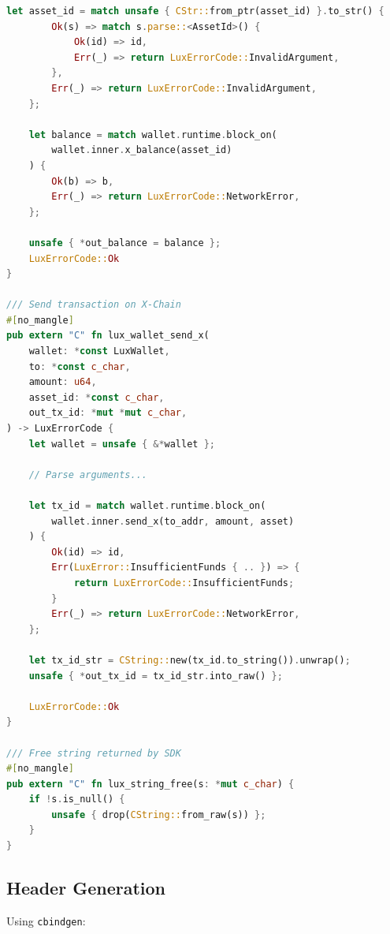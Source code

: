 \documentclass[11pt,twocolumn]{article}
\begin{document}
\begin{lstlisting}[language=Rust,caption=FFI Interface]
    let asset_id = match unsafe { CStr::from_ptr(asset_id) }.to_str() {
        Ok(s) => match s.parse::<AssetId>() {
            Ok(id) => id,
            Err(_) => return LuxErrorCode::InvalidArgument,
        },
        Err(_) => return LuxErrorCode::InvalidArgument,
    };

    let balance = match wallet.runtime.block_on(
        wallet.inner.x_balance(asset_id)
    ) {
        Ok(b) => b,
        Err(_) => return LuxErrorCode::NetworkError,
    };

    unsafe { *out_balance = balance };
    LuxErrorCode::Ok
}

/// Send transaction on X-Chain
#[no_mangle]
pub extern "C" fn lux_wallet_send_x(
    wallet: *const LuxWallet,
    to: *const c_char,
    amount: u64,
    asset_id: *const c_char,
    out_tx_id: *mut *mut c_char,
) -> LuxErrorCode {
    let wallet = unsafe { &*wallet };

    // Parse arguments...

    let tx_id = match wallet.runtime.block_on(
        wallet.inner.send_x(to_addr, amount, asset)
    ) {
        Ok(id) => id,
        Err(LuxError::InsufficientFunds { .. }) => {
            return LuxErrorCode::InsufficientFunds;
        }
        Err(_) => return LuxErrorCode::NetworkError,
    };

    let tx_id_str = CString::new(tx_id.to_string()).unwrap();
    unsafe { *out_tx_id = tx_id_str.into_raw() };

    LuxErrorCode::Ok
}

/// Free string returned by SDK
#[no_mangle]
pub extern "C" fn lux_string_free(s: *mut c_char) {
    if !s.is_null() {
        unsafe { drop(CString::from_raw(s)) };
    }
}
\end{lstlisting}

\subsection{Header Generation}

Using \texttt{cbindgen}:
\end{document}
